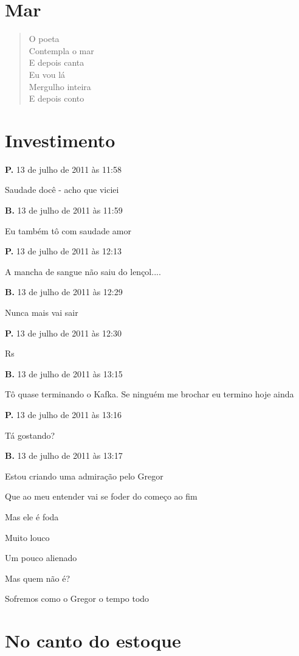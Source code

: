 \chapter{Mar}

\begin{verse} 
O poeta\\
Contempla o mar\\
E depois canta\\
Eu vou lá\\
Mergulho inteira\\
E depois conto\\
\end{verse} 
	
\chapter{Investimento}

\textbf{P.} 13 de julho de 2011 às 11:58

Saudade docê - acho que viciei

\textbf{B.} 13 de julho de 2011 às 11:59

Eu também tô com saudade amor

\textbf{P.} 13 de julho de 2011 às 12:13

A mancha de sangue não saiu do lençol....

\textbf{B.} 13 de julho de 2011 às 12:29

Nunca mais vai sair

\textbf{P.} 13 de julho de 2011 às 12:30

Rs

\textbf{B.} 13 de julho de 2011 às 13:15

Tô quase terminando o Kafka. Se ninguém me brochar eu termino hoje ainda

\textbf{P.} 13 de julho de 2011 às 13:16

Tá gostando?

\textbf{B.} 13 de julho de 2011 às 13:17

Estou criando uma admiração pelo Gregor

Que ao meu entender vai se foder do começo ao fim

Mas ele é foda

Muito louco

Um pouco alienado

Mas quem não é?

Sofremos como o Gregor o tempo todo

\chapter{No canto do estoque}

